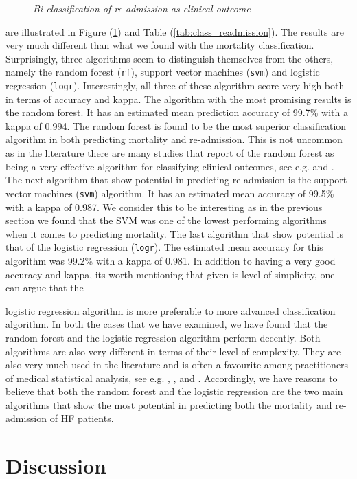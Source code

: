 \documentclass[../thesis.tex]{subfiles}
\begin{document}
\begin{figure}[h!]
    \centering
    \scalebox{.8}{}
    \caption[Bi-classification of re-admission as clinical outcome]{\textit{Bi-classification of re-admission as clinical outcome}}
    \label{fig:bi_class_read}
\end{figure}

\noindent are illustrated in Figure (\ref{fig:bi_class_read}) and Table (\ref{tab:class_readmission}). The results are very much different than what we found with the mortality classification. Surprisingly, three algorithms seem to distinguish themselves from the others, namely the random forest (\texttt{rf}), support vector machines (\texttt{svm}) and logistic regression (\texttt{logr}). Interestingly, all three of these algorithm score very high both in terms of accuracy and kappa. The algorithm with the most promising results is the random forest. It has an estimated mean prediction accuracy of 99.7\% with a kappa of 0.994. The random forest is found to be the most superior classification algorithm in both predicting mortality and re-admission. This is not uncommon as in the literature there are many studies that report of the random forest as being a very effective algorithm for classifying clinical outcomes, see e.g. \cite{austin2013using} and \cite{zolfaghar2013big}. The next algorithm that show potential in predicting re-admission is the support vector machines (\texttt{svm}) algorithm. It has an estimated mean accuracy of 99.5\% with a kappa of 0.987. We consider this to be interesting as in the previous section we found that the SVM was one of the lowest performing algorithms when it comes to predicting mortality. The last algorithm that show potential is that of the logistic regression (\texttt{logr}). The estimated mean accuracy for this algorithm was 99.2\% with a kappa of 0.981. In addition to having a very good accuracy and kappa, its worth mentioning that given is level of simplicity, one can argue that the  



\noindent logistic regression algorithm is more preferable to more advanced classification algorithm. In both the cases that we have examined, we have found that the random forest and the logistic regression algorithm perform decently. Both algorithms are also very different in terms of their level of complexity. They are also very much used in the literature and is often a favourite among practitioners of medical statistical analysis, see e.g. \cite{austin2013using}, \cite{zolfaghar2013big}, \cite{shah2014phenomapping} and \cite{panahiazar2015using}. Accordingly, we have reasons to believe that both the random forest and the logistic regression are the two main algorithms that show the most potential in predicting both the mortality and re-admission of HF patients.



\section{Discussion}
\end{document}

